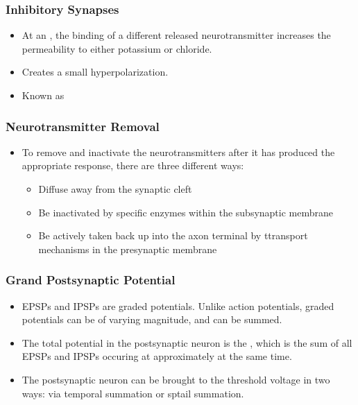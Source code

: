 \documentclass{article}
\numberwithin{equation}{section}
\begin{document}
\subsubsection{Inhibitory Synapses}
\begin{itemize}
    \item At an , the binding of a different released neurotransmitter increases the permeability to either potassium or chloride.
    \item Creates a small hyperpolarization.
    \item Known as 
\end{itemize}
\subsubsection{Neurotransmitter Removal}
\begin{itemize}
    \item To remove and inactivate the neurotransmitters after it has produced the appropriate response, there are three different ways:
    \begin{itemize}
        \item Diffuse away from the synaptic cleft
        \item Be inactivated by specific enzymes within the subsynaptic membrane
        \item Be actively taken back up into the axon terminal by ttransport mechanisms in the presynaptic membrane
    \end{itemize}
\end{itemize}
\subsubsection{Grand Postsynaptic Potential}
\begin{itemize}
    \item EPSPs and IPSPs are graded potentials. Unlike action potentials, graded potentials can be of varying magnitude, and can be summed.
    \item The total potential in the postsynaptic neuron is the , which is the sum of all EPSPs and IPSPs occuring at approximately at the same time.
    \item The postsynaptic neuron can be brought to the threshold voltage in two ways: via temporal summation or sptail summation.
\end{itemize}
\end{document}

